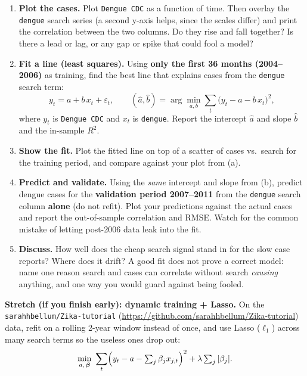 \documentclass[11pt]{article}
\begin{document}
\begin{enumerate}[label=(\alph*)]
  \item \textbf{Plot the cases.} Plot \texttt{Dengue CDC} as a function of time. Then overlay
        the \texttt{dengue} search series (a second y-axis helps, since the scales differ) and
        print the correlation between the two columns. Do they rise and fall together? Is
        there a lead or lag, or any gap or spike that could fool a model?

  \item \textbf{Fit a line (least squares).} Using \textbf{only the first 36 months
        (2004--2006)} as training, find the best line that explains cases from the
        \texttt{dengue} search term:
        \[
          y_t = a + b\,x_t + \varepsilon_t, \qquad
          (\hat a, \hat b) = \arg\min_{a,b}\sum_t \bigl(y_t - a - b\,x_t\bigr)^2 ,
        \]
        where $y_t$ is \texttt{Dengue CDC} and $x_t$ is \texttt{dengue}. Report the intercept
        $\hat a$ and slope $\hat b$ and the in-sample $R^2$.

  \item \textbf{Show the fit.} Plot the fitted line on top of a scatter of cases vs.\ search
        for the training period, and compare against your plot from (a).

  \item \textbf{Predict and validate.} Using the \emph{same} intercept and slope from (b),
        predict dengue cases for the \textbf{validation period 2007--2011} from the
        \texttt{dengue} search column \textbf{alone} (do not refit). Plot your predictions
        against the actual cases and report the out-of-sample correlation and RMSE. Watch for
        the common mistake of letting post-2006 data leak into the fit.

  \item \textbf{Discuss.} How well does the cheap search signal stand in for the slow case
        reports? Where does it drift? A good fit does not prove a correct model: name one
        reason search and cases can correlate without search \emph{causing} anything, and one
        way you would guard against being fooled.
\end{enumerate}

\vspace{0.3em}
\noindent\textbf{Stretch (if you finish early): dynamic training + Lasso.} On the
\texttt{sarahhbellum/Zika-tutorial}
(\url{https://github.com/sarahhbellum/Zika-tutorial}) data, refit on a rolling 2-year
window instead of once, and use Lasso ($\ell_1$) across many search terms so the useless
ones drop out:
\[
  \min_{a,\,\boldsymbol\beta}\ \sum_t\Bigl(y_t - a - \textstyle\sum_j \beta_j x_{j,t}\Bigr)^2
  + \lambda \sum_j |\beta_j| .
\]
\end{document}
